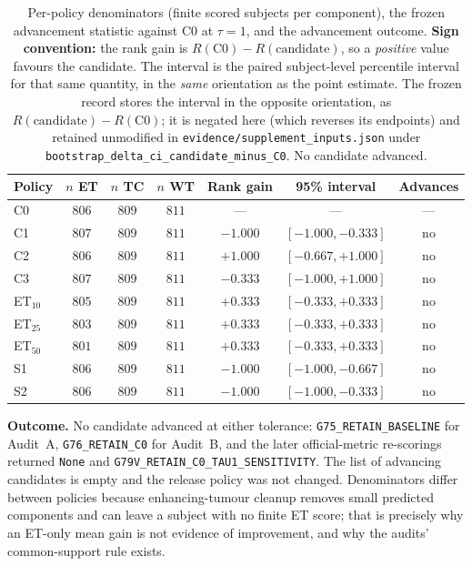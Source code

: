 \documentclass[runningheads]{llncs}
\begin{document}
\begin{table}[!htbp]\centering\small
\caption{Per-policy denominators (finite scored subjects per component), the frozen advancement statistic against C0 at $\tau=1$, and the advancement outcome. \textbf{Sign convention:} the rank gain is $R(\mathrm{C0})-R(\mathrm{candidate})$, so a \emph{positive} value favours the candidate. The interval is the paired subject-level percentile interval for that same quantity, in the \emph{same} orientation as the point estimate. The frozen record stores the interval in the opposite orientation, as $R(\mathrm{candidate})-R(\mathrm{C0})$; it is negated here (which reverses its endpoints) and retained unmodified in \texttt{evidence/supplement\_inputs.json} under \texttt{bootstrap\_delta\_ci\_candidate\_minus\_C0}. No candidate advanced.}
\label{tab:abdenom}
\begin{tabular}{@{}lcccccc@{}}
\toprule
Policy & $n$ ET & $n$ TC & $n$ WT & Rank gain & 95\% interval & Advances \\
\midrule
C0 & $806$ & $809$ & $811$ & --- & --- & --- \\
\midrule
C1 & $807$ & $809$ & $811$ & $-1.000$ & $[-1.000,-0.333]$ & no \\
C2 & $806$ & $809$ & $811$ & $+1.000$ & $[-0.667,+1.000]$ & no \\
C3 & $807$ & $809$ & $811$ & $-0.333$ & $[-1.000,+1.000]$ & no \\
ET$_{10}$ & $805$ & $809$ & $811$ & $+0.333$ & $[-0.333,+0.333]$ & no \\
ET$_{25}$ & $803$ & $809$ & $811$ & $+0.333$ & $[-0.333,+0.333]$ & no \\
ET$_{50}$ & $801$ & $809$ & $811$ & $+0.333$ & $[-0.333,+0.333]$ & no \\
S1 & $806$ & $809$ & $811$ & $-1.000$ & $[-1.000,-0.667]$ & no \\
S2 & $806$ & $809$ & $811$ & $-1.000$ & $[-1.000,-0.333]$ & no \\
\bottomrule
\end{tabular}
\end{table}

\noindent\textbf{Outcome.} No candidate advanced at either tolerance: \texttt{G75\_\allowbreak{}RETAIN\_\allowbreak{}BASELINE} for Audit~A, \texttt{G76\_\allowbreak{}RETAIN\_\allowbreak{}C0} for
Audit~B, and the later official-metric re-scorings returned \texttt{None} and \texttt{G79V\_\allowbreak{}RETAIN\_\allowbreak{}C0\_\allowbreak{}TAU1\_\allowbreak{}SENSITIVITY}. The list of advancing
candidates is empty and the release policy was not changed. Denominators differ between policies
because enhancing-tumour cleanup removes small predicted components and can leave a subject with no
finite ET score; that is precisely why an ET-only mean gain is not evidence of improvement, and why
the audits' common-support rule exists.
\end{document}
